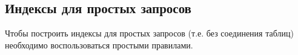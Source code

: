\subsection{Индексы для простых запросов}

Чтобы построить индексы для простых запросов (т.е. без соединения таблиц) необходимо воспользоваться простыми правилами.

